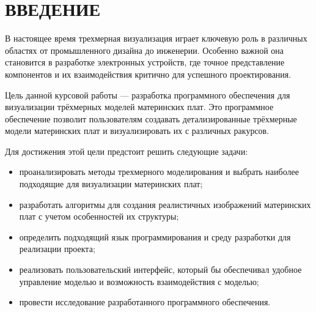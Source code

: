 \chapter*{ВВЕДЕНИЕ}

В настоящее время трехмерная визуализация играет ключевую роль в различных областях от промышленного дизайна до инженерии. Особенно важной она становится в разработке электронных устройств, где точное представление компонентов и их взаимодействия критично для успешного проектирования.

Цель данной курсовой работы --- разработка программного обеспечения для визуализации трёхмерных моделей материнских плат. Это программное обеспечение позволит пользователям создавать детализированные трёхмерные модели материнских плат и визуализировать их с различных ракурсов.


Для достижения этой цели предстоит решить следующие задачи:
\begin{itemize}[label=---]
	\item проанализировать методы трехмерного моделирования и выбрать наиболее подходящие для визуализации материнских плат;
	\item разработать алгоритмы для создания реалистичных изображений материнских плат с учетом особенностей их структуры;
	\item определить подходящий язык программирования и среду разработки для реализации проекта;
	\item реализовать пользовательский интерфейс, который бы обеспечивал удобное управление моделью и возможность взаимодействия с моделью;
	\item провести исследование разработанного программного обеспечения.
\end{itemize}
